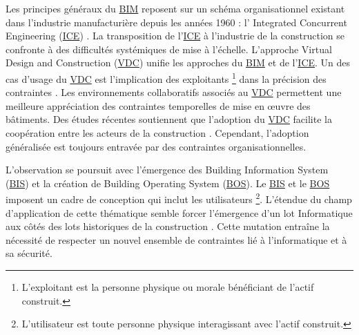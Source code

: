 \documentclass[a4paper,12pt]{article}
\begin{document}
Les principes généraux du \protect\hyperlink{gls-1}{\label{gls-1-use-6}BIM} reposent sur un schéma organisationnel existant dans l’industrie manufacturière depuis les années 1960 \autocite{caelenConsommateurAuCoeur2004a} : l' Integrated Concurrent Engineering
 (\protect\hyperlink{gls-3}{\label{gls-3-use-1}ICE}) \autocite{delsavioVirtualDesignConstruction2022a}. La transposition de l’\protect\hyperlink{gls-3}{\label{gls-3-use-2}ICE} à l’industrie de la construction se confronte à des difficultés systémiques de mise à l’échelle. L’approche Virtual Design and Construction
 (\protect\hyperlink{gls-4}{\label{gls-4-use-1}VDC}) unifie les approches du \protect\hyperlink{gls-1}{\label{gls-1-use-7}BIM} et de l’\protect\hyperlink{gls-3}{\label{gls-3-use-3}ICE}. Un des cas d’usage du \protect\hyperlink{gls-4}{\label{gls-4-use-2}VDC} est  l’implication des exploitants \footnote{L’exploitant est la personne physique ou morale bénéficiant de l’actif construit.} dans la précision des contraintes \autocite{delsavioVirtualDesignConstruction2022a,mathiaspettergustafssonRoleVDCProfessionals2015a}. Les environnements collaboratifs associés au \protect\hyperlink{gls-4}{\label{gls-4-use-3}VDC} permettent une meilleure appréciation des contraintes temporelles de mise en œuvre des bâtiments. Des études récentes soutiennent que l'adoption du \protect\hyperlink{gls-4}{\label{gls-4-use-4}VDC} facilite la coopération entre les acteurs de la construction \autocite{delsavioVirtualDesignConstruction2022a,mugheesaslamIntegratedImplementationVirtual2021}. Cependant, l'adoption généralisée est toujours entravée par des contraintes organisationnelles.

L’observation se poursuit avec l’émergence des Building Information System
 (\protect\hyperlink{gls-5}{\label{gls-5-use-1}BIS}) et la création de Building Operating System
 (\protect\hyperlink{gls-6}{\label{gls-6-use-1}BOS}). Le \protect\hyperlink{gls-5}{\label{gls-5-use-2}BIS} et le \protect\hyperlink{gls-6}{\label{gls-6-use-2}BOS} imposent un cadre de conception qui inclut les utilisateurs \footnote{L’utilisateur est toute personne physique interagissant avec l’actif construit.}. L’étendue du champ d’application de cette thématique semble forcer l’émergence d’un lot Informatique aux côtés des lots historiques de la construction \autocites{mohamedyassinebenjemaaImplementationSolutionsIntegrees2017a}[][]{cottetSystemesTempsReel2005}{smartbuildingallianceBISBOSOutils2022}. Cette mutation entraîne la nécessité de respecter un nouvel ensemble de contraintes lié à l’informatique et à sa sécurité.
\end{document}
